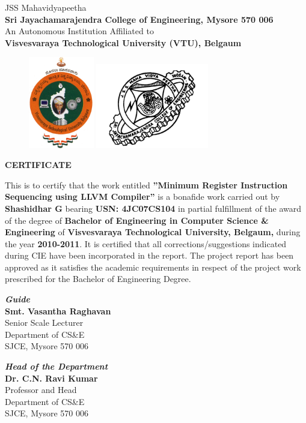 \documentclass[12pt]{report}
\begin{document}
\begin{center}\large JSS Mahavidyapeetha\\\textbf{Sri Jayachamarajendra College of Engineering, Mysore 570 006}\\
An Autonomous Institution Affiliated to\\
\textbf{Visvesvaraya Technological University (VTU), Belgaum}\\
\vspace{0.2cm}
\begin{figure}[h]
\centering
\includegraphics[height=4cm]{vtu.png}
\hspace{0.1\textwidth}
\includegraphics[height=3.7cm]{jcelogo.jpg}
\end{figure}
\Huge{\bf {CERTIFICATE}}\end{center}

This is to certify that the work entitled {\bf ''Minimum Register Instruction Sequencing using LLVM Compiler''} is a bonafide work carried out by {\bf Shashidhar G} bearing {\bf USN: 4JC07CS104} in partial fulfillment of the award of the degree of {\bf Bachelor of Engineering in Computer Science \& Engineering} of {\bf Visvesvaraya Technological University, Belgaum,} during the year {\bf 2010-2011}. It is certified that all corrections/suggestions indicated during CIE have been incorporated in the report. The project report has been approved as it satisfies the academic requirements in respect of the project work prescribed for the Bachelor of Engineering Degree.

\vspace{3.5cm}
\begin{minipage}[t]{0.5\textwidth}%
{\bf \emph{Guide}\\}
{\bf Smt. Vasantha Raghavan} \\
Senior Scale Lecturer\\
Department of CS\&E\\
SJCE, Mysore 570 006
\end{minipage}\hspace{2cm}
\begin{minipage}[t]{0.4\textwidth}%
{\bf \emph{Head of the Department}}\\
{\bf Dr. C.N. Ravi Kumar}\\
Professor and Head\\
Department of CS\&E\\
SJCE, Mysore 570 006
\end{minipage}
\end{document}
